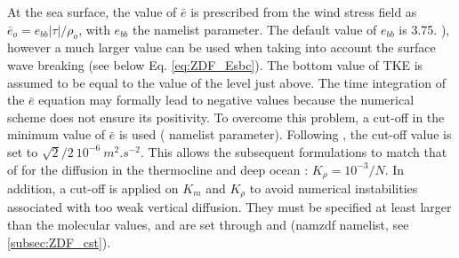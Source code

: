 \documentclass[../tex_main/NEMO_manual]{subfiles}
\begin{document}
At the sea surface, the value of $\bar{e}$ is prescribed from the wind stress field as
$\bar{e}_o = e_{bb} |\tau| / \rho_o$, with $e_{bb}$ the  namelist parameter.
The default value of $e_{bb}$ is 3.75. \citep{Gaspar1990}), however a much larger value can be used when
taking into account the surface wave breaking (see below Eq. \autoref{eq:ZDF_Esbc}).
The bottom value of TKE is assumed to be equal to the value of the level just above.
The time integration of the $\bar{e}$ equation may formally lead to negative values because
the numerical scheme does not ensure its positivity.
To overcome this problem, a cut-off in the minimum value of $\bar{e}$ is used ( namelist parameter).
Following \citet{Gaspar1990}, the cut-off value is set to $\sqrt{2}/2~10^{-6}~m^2.s^{-2}$.
This allows the subsequent formulations to match that of \citet{Gargett1984} for the diffusion in
the thermocline and deep ocean :  $K_\rho = 10^{-3} / N$.
In addition, a cut-off is applied on $K_m$ and $K_\rho$ to avoid numerical instabilities associated with
too weak vertical diffusion.
They must be specified at least larger than the molecular values, and are set through  and
 (namzdf namelist, see \autoref{subsec:ZDF_cst}).
\end{document}
